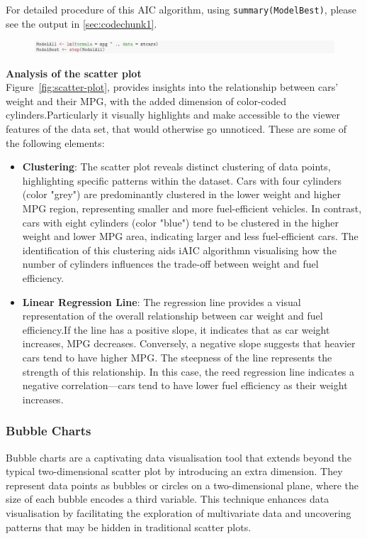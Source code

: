 \documentclass{article}\usepackage[]{graphicx}\usepackage[]{xcolor}
\begin{document}
\noindent
For detailed procedure of this AIC algorithm, using \texttt{summary(ModelBest)}, please see the output in \ref{sec:codechunk1}.

\begin{figure}[H]
    \centering
    \includegraphics[width=1\textwidth]{codeshoot.png}
    \label{fig:codeshoot}
\end{figure}

\noindent
\textbf{Analysis of the scatter plot}\\

\noindent
Figure~\ref{fig:scatter-plot}, provides insights into the relationship between cars' weight and their MPG, with the added dimension of color-coded cylinders.Particularly it visually highlights and make accessible to the viewer features of the data set, that would otherwise go unnoticed. These are some of the following elements: 

\begin{itemize}
    \item \textbf{Clustering}: The scatter plot reveals distinct clustering of data points, highlighting specific patterns within the dataset. Cars with four cylinders (color "grey") are predominantly clustered in the lower weight and higher MPG region, representing smaller and more fuel-efficient vehicles. In contrast, cars with eight cylinders (color "blue") tend to be clustered in the higher weight and lower MPG area, indicating larger and less fuel-efficient cars. The identification of this clustering aids iAIC algorithmn visualising how the number of cylinders influences the trade-off between weight and fuel efficiency.
    \item \textbf{Linear Regression Line}: The regression line provides a visual representation of the overall relationship between car weight and fuel efficiency.If the line has a positive slope, it indicates that as car weight increases, MPG decreases. Conversely, a negative slope suggests that heavier cars tend to have higher MPG. The steepness of the line represents the strength of this relationship. In this case, the reed regression line indicates a negative correlation—cars tend to have lower fuel efficiency as their weight increases.
\end{itemize}

\subsubsection{Bubble Charts}
Bubble charts are a captivating data visualisation tool that extends beyond the typical two-dimensional scatter plot by introducing an extra dimension. They represent data points as bubbles or circles on a two-dimensional plane, where the size of each bubble encodes a third variable. This technique enhances data visualisation by facilitating the exploration of multivariate data and uncovering patterns that may be hidden in traditional scatter plots.\\
\end{document}
